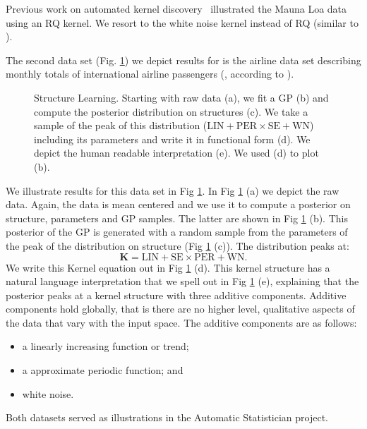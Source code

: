 Previous work on automated kernel discovery~\citep{duvenaud2013structure} illustrated the Mauna Loa data using an RQ kernel.
We resort to the white noise kernel instead of RQ (similar to \citep{lloyd2014automatic}).


The second data set (Fig. \ref{fig:posterior_airline}) we depict results for is  the airline 
data set describing monthly totals of international airline passengers (\citealp{box2011time}, according to \citealp{duvenaud2013structure}). 
\begin{figure}
\centering

\caption{\small Structure Learning. Starting with raw data (a), we fit a \ac{GP}
(b) and compute the posterior distribution on structures (c). We take a sample
of the peak of this distribution ($\text{LIN}+\text{PER} \times \text{SE}+\text{WN}$)
including its parameters and write it in functional form (d). We depict the
human readable interpretation (e). We used (d) to plot (b).}\label{fig:posterior_airline}
\end{figure}

We illustrate results for this data set in Fig \ref{fig:posterior_airline}. In Fig \ref{fig:posterior_airline} (a) we depict the raw data. 
Again, the data is mean centered and we use it to 
compute a posterior on structure, parameters and \ac{GP}
samples.
The latter are shown in  Fig \ref{fig:posterior_airline} (b).
This posterior of the \ac{GP} is generated with a random sample from the parameters
of the peak of the distribution on structure (Fig \ref{fig:posterior_airline} (c)).
The distribution peaks at:
\begin{equation}
\mathbf{K}=\text{LIN} +  \text{SE} \times \text{PER}+ \text{WN}.
\end{equation}
We write this Kernel equation out in Fig \ref{fig:posterior_airline} (d).
This kernel structure has a natural language interpretation that we spell out in
Fig \ref{fig:posterior_airline} (e), explaining that 
the posterior peaks at a kernel structure with three additive components.
Additive components hold globally, that is there are no higher level, qualitative aspects
of the data that vary with the input space.
The additive components are as follows: 
\begin{itemize}
\item a linearly increasing function or trend;
\item a approximate periodic function; and
\item  white noise.
\end{itemize}
Both datasets served as illustrations in the Automatic Statistician project.



